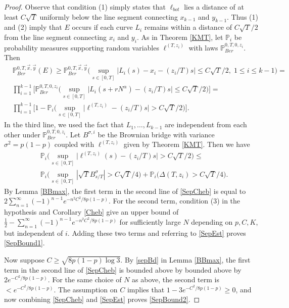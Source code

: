\begin{proof}
	Observe that condition (1) simply states that $\ell_{bot}$ lies a distance of at least $C\sqrt{T}$ uniformly below the line segment connecting $x_{k-1}$ and $y_{k-1}$. Thus (1) and (2) imply that $E$ occurs if each curve $L_i$ remains within a distance of $C\sqrt{T}/2$ from the line segment connecting $x_i$ and $y_i$. As in Theorem \ref{KMT}, let $\mathbb{P}_i$ be probability measures supporting random variables $\ell^{(T,z_i)}$ with laws $\mathbb{P}^{0,T,0,z_i}_{Ber}$. Then
	\begin{equation}\label{SepEst}
	\begin{split}
	& \mathbb{P}^{0, T,\vec{x},\vec{y}}_{Ber} (E) \geq \mathbb{P}^{0,T,\vec{x},\vec{y}}_{Ber} \Big(\sup_{s\in[0,T]} \big|L_i(s) - x_i - (z_i/T)s\big| \leq C\sqrt{T}/2, \;1\leq i\leq k-1\Big) =\\
	&\prod_{i=1}^{k-1}\Big[ \mathbb{P}^{0,T,0,z_i}_{Ber} \Big(\sup_{s\in[0,T]} \big|L_i(s+rN^\alpha) - (z_i/T)s\big| \leq C\sqrt{T}/2\Big)\Big] =\\
	&\prod_{i=1}^{k-1}\Big[ 1 - \mathbb{P}_i\Big(\sup_{s\in[0,T]} \big|\ell^{(T,z_i)} - (z_i/T)s\big| > C\sqrt{T}/2\Big)\Big]. \end{split}
	\end{equation}
	In the third line, we used the fact that $L_1,\dots,L_{k-1}$ are independent from each other under $\mathbb{P}^{0,T,0,z_i}_{Ber}$. Let $B^{\sigma,i}$ be the Brownian bridge with variance $\sigma^2 = p(1-p)$ coupled with $\ell^{(T,z_i)}$ given by Theorem \ref{KMT}. Then we have
	\begin{equation}\label{SepCheb}
	\begin{split}
	&\mathbb{P}_i \Big(\sup_{s\in[0,T]} \big|\ell^{(T,z_i)}(s) - (z_i/T)s\big| > C\sqrt{T}/2\Big) \leq \\
	& \mathbb{P}_i\Big(\sup_{s\in[0,T]} |\sqrt{T}B^{\sigma}_{s/T}| > C\sqrt{T}/4\Big) + \mathbb{P}_i\Big(\Delta(T,z_i) > C\sqrt{T}/4\Big).
	\end{split}
	\end{equation}
	By Lemma \ref{BBmax}, the first term in the second line of \eqref{SepCheb} is equal to $2\sum_{n=1}^\infty (-1)^{n-1} e^{-n^2C^2/8p(1-p)}$. For the second term, condition (3) in the hypothesis and Corollary \ref{Cheb} give an upper bound of $\frac{1}{2} - \sum_{n=1}^\infty (-1)^{n-1} e^{-n^2C^2/8p(1-p)}$ for sufficiently large $N$ depending on $p,C,K$, but independent of $i$. Adding these two terms and referring to \eqref{SepEst} proves \eqref{SepBound1}.
	
	Now suppose $C\geq\sqrt{8p(1-p)\log 3}$. By \eqref{sepBd} in Lemma \ref{BBmax}, the first term in the second line of \eqref{SepCheb} is bounded above by bounded above by $2e^{-C^2/8p(1-p)}$. For the same choice of $N$ as above, the second term is $<e^{-C^2/8p(1-p)}$. The assumption on $C$ implies that $1-3e^{-C^2/8p(1-p)}\geq 0$, and now combining \eqref{SepCheb} and \eqref{SepEst} proves \eqref{SepBound2}.
\end{proof}


